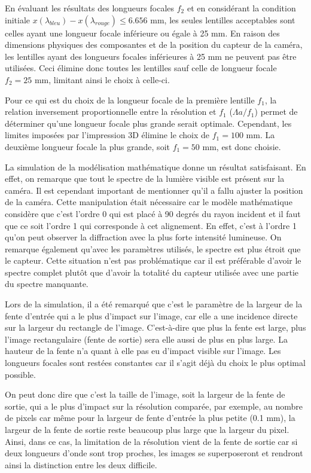 \documentclass[conference]{IEEEtran}
\begin{document}
En évaluant les résultats des longueurs focales $f_2$ et en considérant la condition initiale
$x(\lambda_{bleu})-x(\lambda_{rouge})\leq 6.656$ mm, les seules lentilles acceptables sont celles
ayant une longueur focale inférieure ou égale à 25 mm. En raison des dimensions physiques des composantes et de
la position du capteur de la caméra, les lentilles ayant des longueurs focales inférieures à 25 mm ne peuvent pas être utilisées.
Ceci élimine donc toutes les lentilles sauf celle de longueur focale $f_2=25$ mm, limitant ainsi le choix à celle-ci.

Pour ce qui est du choix de la longueur focale de la première lentille $f_1$, la relation inversement proportionnelle
entre la résolution et $f_1$ ($\Lambda a/f_1$) permet de déterminer qu'une longueur focale plus grande serait optimale. Cependant,
les limites imposées par l'impression 3D élimine le choix de $f_1=100$ mm. La deuxième longueur focale la plus grande, soit $f_1=50$ mm,
est donc choisie.

La simulation de la modélisation mathématique donne un résultat satisfaisant. En effet, on remarque que tout le spectre
de la lumière visible est présent sur la caméra. Il est cependant important de mentionner qu'il a fallu ajuster la
position de la caméra. Cette manipulation était nécessaire car le modèle mathématique considère que c'est l'ordre 0 qui est placé à 90 degrés du rayon
incident et il faut que ce soit l'ordre 1 qui corresponde à cet alignement. En effet, c'est à l'ordre 1 qu'on peut observer
la diffraction avec la plus forte intensité lumineuse. On remarque également qu'avec les paramètres utilisés, le spectre est plus étroit
que le capteur. Cette situation n'est pas problématique car il est préférable d'avoir le spectre complet plutôt que d'avoir la totalité du capteur utilisée
avec une partie du spectre manquante.

Lors de la simulation, il a été remarqué que c'est le paramètre de la largeur de la fente d'entrée qui a le plus d'impact sur l'image,
car elle a une incidence directe sur la largeur du rectangle de l'image. C'est-à-dire que plus la fente est large, plus
l'image rectangulaire (fente de sortie) sera elle aussi de plus en plus large. La hauteur de la fente n'a quant à elle pas eu d'impact
visible sur l'image. Les longueurs focales sont restées constantes car il s'agit déjà du choix le plus optimal possible.

On peut donc dire que c'est la taille de l'image, soit la largeur de la fente de sortie, qui a le plus d'impact sur la résolution comparée, par exemple, au nombre de pixels
car même pour la largeur de fente d'entrée la plus petite (0.1 mm), la largeur de la fente de sortie reste beaucoup plus large que la largeur du pixel.
Ainsi, dans ce cas, la limitation de la résolution vient de la fente de sortie car si deux longueurs d'onde sont trop proches, les images se superposeront
et rendront ainsi la distinction entre les deux difficile.
\end{document}
